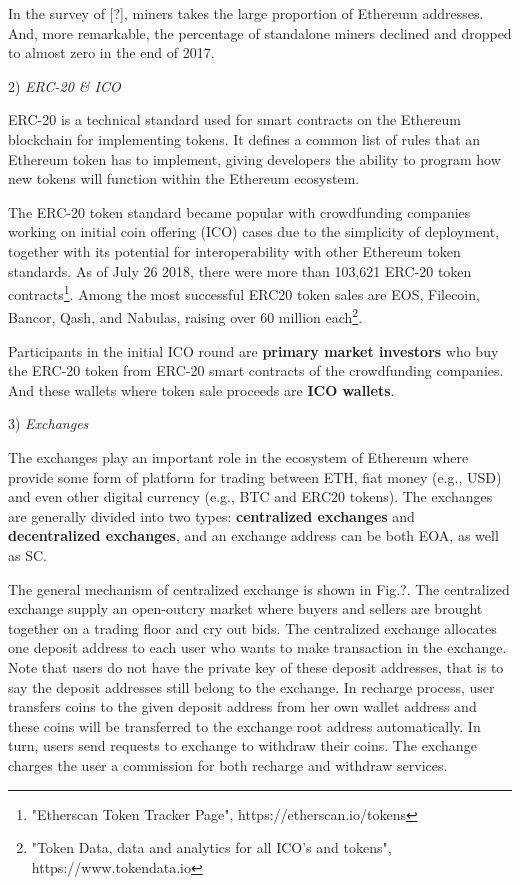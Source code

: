 In the survey of [?], miners takes the large proportion of Ethereum addresses. And, more remarkable, the percentage of standalone miners declined and dropped to almost zero in the end of 2017. 

2) \emph{ERC-20 \& ICO}

ERC-20 is a technical standard used for smart contracts on the Ethereum blockchain for implementing tokens\cite{erc-20-wiki}.  It defines a common list of rules that an Ethereum token has to implement, giving developers the ability to program how new tokens will function within the Ethereum ecosystem.

The ERC-20 token standard became popular with crowdfunding companies working on initial coin offering (ICO) cases due to the simplicity of deployment, together with its potential for interoperability with other Ethereum token standards\cite{erc-20}. As of July 26 2018, there were more than 103,621 ERC-20 token contracts\footnote{"Etherscan Token Tracker Page", https://etherscan.io/tokens}. Among the most successful ERC20 token sales are EOS, Filecoin, Bancor, Qash, and Nabulas, raising over 60 million each\footnote{"Token Data, data and analytics for all ICO's and tokens", https://www.tokendata.io}.

Participants in the initial ICO round are \textbf{primary market investors} who buy the ERC-20 token from ERC-20 smart contracts of the crowdfunding companies. And these wallets where token sale proceeds are \textbf{ICO wallets}.

3) \emph{Exchanges}

The exchanges play an important role in the ecosystem of Ethereum where provide some form of platform for trading between ETH, fiat money (e.g., USD) and even other digital currency (e.g., BTC and ERC20 tokens). The exchanges are generally divided into two types: \textbf{centralized exchanges} and \textbf{decentralized exchanges}, and an exchange address can be both EOA, as well as SC. 

The general mechanism of centralized exchange is shown in Fig.?. The centralized exchange supply an open-outcry market where buyers and sellers are brought together on a trading floor and cry out bids. The centralized exchange allocates one deposit address to each user who wants to make transaction in the exchange. Note that users do not have the private key of these deposit addresses, that is to say the deposit addresses still belong to the exchange. In recharge process, user transfers coins to the given deposit address from her own wallet address and these coins will be transferred to the exchange root address automatically. In turn, users send requests to exchange to withdraw their coins. The exchange charges the user a commission for both recharge and withdraw services.

